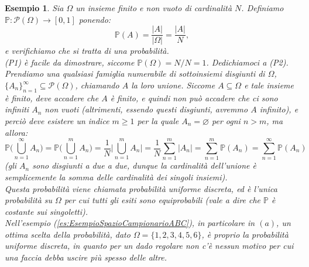 \documentclass[11pt]{book}
\theoremstyle{Definizione}
\theoremstyle{TeoremaProposizioneLemmaCorollario}
\theoremstyle{OsservazioneNota}
\newtheorem{myes}{Esempio}[section]
\newcommand{\parti}[1]{\mathcal{P}\left({#1}\right)}
\renewcommand{\P}{\mathbb{P}}
\begin{document}
\begin{myes}
Sia $\Omega$ un insieme finito e non vuoto di cardinalità $N$. Definiamo $\P:\parti{\Omega}\longrightarrow [0,1]$ ponendo:
$$
\P(A) = \frac{|A|}{|\Omega|} = \frac{|A|}{N},
$$
e verifichiamo che si tratta di una probabilità.\\
(P1) è facile da dimostrare, siccome $\P(\Omega) = N/N = 1$. Dedichiamoci a (P2).\\
Prendiamo una qualsiasi famiglia numerabile di sottoinsiemi disgiunti di $\Omega$, $\{A_n\}_{n = 1}^\infty \subseteq \parti{\Omega}$, chiamando $A$ la loro unione. Siccome $A\subseteq \Omega$ e tale insieme è finito, deve accadere che $A$ è finito, e quindi non può accadere che ci sono infiniti $A_n$ non vuoti (altrimenti, essendo questi disgiunti, avremmo $A$ infinito), e perciò deve esistere un indice $m\geq 1$ per la quale $A_n = \varnothing$ per ogni $n>m$, ma allora:
$$
\P\Bigg(\bigcup_{n = 1}^\infty A_n\Bigg) = \P\Bigg(\bigcup_{n = 1}^m A_n\Bigg) = \frac{1}{N}\Bigg|\bigcup_{n = 1}^m A_n\Bigg| = \frac{1}{N}\sum_{n = 1}^m |A_n| = \sum_{n = 1}^m \P(A_n) = \sum_{n = 1}^\infty \P(A_n)
$$
(gli $A_n$ sono disgiunti a due a due, dunque la cardinalità dell'unione è semplicemente la somma delle cardinalità dei singoli insiemi).\\
Questa probabilità viene chiamata probabilità uniforme discreta, ed è l'unica probabilità su $\Omega$ per cui tutti gli esiti sono equiprobabili (vale a dire che $\P$ è costante sui singoletti).\\
Nell'esempio (\ref{es:EsempioSpazioCampionarioABC}), in particolare in $(a)$, un ottima scelta della probabilità, dato $\Omega = \{1,2,3,4,5,6\}$, è proprio la probabilità uniforme discreta, in quanto per un dado regolare non c'è nessun motivo per cui una faccia debba uscire più spesso delle altre.
\end{myes}
\end{document}
